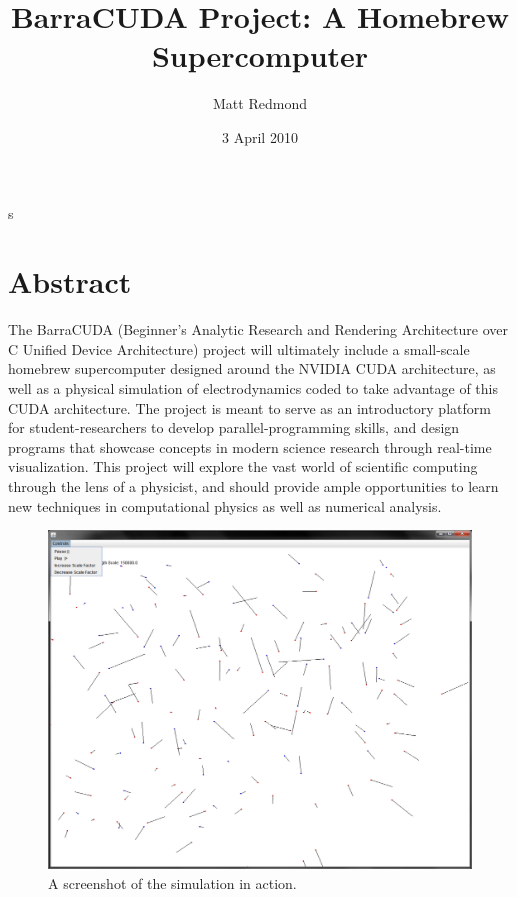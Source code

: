 s\documentclass[10pt]{article}
\title{BarraCUDA Project: A Homebrew Supercomputer}
\author{Matt Redmond}
\date{3 April 2010}
\begin{document}
\maketitle
\section{Abstract}
The BarraCUDA (Beginner's Analytic Research and Rendering Architecture over C Unified Device Architecture) project will ultimately include a small-scale homebrew supercomputer designed around the NVIDIA CUDA architecture, as well as a physical simulation of electrodynamics coded to take advantage of this CUDA architecture. The project is meant to serve as an introductory platform for student-researchers to develop parallel-programming skills, and design programs that showcase concepts in modern science research through real-time visualization. This project will explore the vast world of scientific computing through the lens of a physicist, and should provide ample opportunities to learn new techniques in computational physics as well as numerical analysis.
\begin{figure}[h]
	\centering
		\includegraphics[scale = 0.35]{barracuda2DScreenshot.png}
	\caption{A screenshot of the simulation in action.}
	\label{fig:barracuda2DScreenshot}
\end{figure}

\clearpage
\tableofcontents
\clearpage
\end{document}
